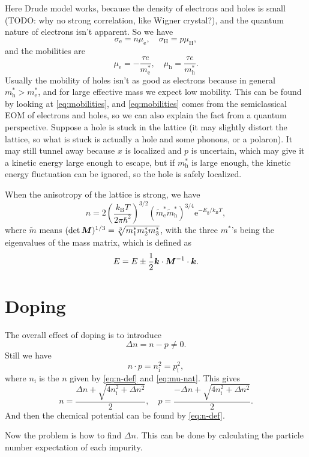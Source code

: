 \documentclass[hyperref, a4paper]{article}
\newcommand*{\ee}{\mathrm{e}}
\begin{document}
Here Drude model works, because the density of electrons and holes is small 
(TODO: why no strong correlation, like Wigner crystal?),
and the quantum nature of electrons isn't apparent.
So we have 
\begin{equation}
    \sigma_\text{e} = n \mu_{\text{e}}, \quad 
    \sigma_{\text{H}} = p \mu_{\text{H}},
\end{equation}
and the mobilities are 
\begin{equation}
    \mu_{\text{e}} = - \frac{\tau e}{m^*_{\text{e}}}, \quad 
    \mu_{\text{h}} =   \frac{\tau e}{m^*_{\text{h}}}.
    \label{eq:mobilities}
\end{equation}
Usually the mobility of holes isn't as good as electrons because in general 
$m_{\text{h}}^* > m_{\text{e}}^*$,
and for large effective mass we expect low mobility.
This can be found by looking at \eqref{eq:mobilities},
and \eqref{eq:mobilities} comes from the semiclassical EOM of electrons and holes,
so we can also explain the fact from a quantum perspective.
Suppose a hole is stuck in the lattice 
(it may slightly distort the lattice,
so what is stuck is actually a hole and some phonons, 
or a polaron).
It may still tunnel away because $x$ is localized 
and $p$ is uncertain, which may give it a kinetic energy large enough to escape,
but if $m^*_{\text{h}}$ is large enough, 
the kinetic energy fluctuation can be ignored,
so the hole is safely localized.

When the anisotropy of the lattice is strong, we have 
\begin{equation}
    n = 2 \left( \frac{k_{\text{B}} T}{2 \pi \hbar^2} \right)^{3/2} (\tilde{m}_{\text{e}}^* \tilde{m}_{\text{h}}^*)^{3/4} \ee^{- E_{\text{g}} / k_{\text{B}} T},
\end{equation}
where $\tilde{m}$ means $(\det \vb*{M})^{1/3} = \sqrt[3]{m_1^* m_2^* m_3^*}$,
with the three $m^*$'s being the eigenvalues of the mass matrix,
which is defined as 
\begin{equation}
    E = E \pm \frac{1}{2} \vb*{k} \cdot \vb*{M}^{-1} \cdot \vb*{k}.
\end{equation}

\section{Doping}

The overall effect of doping is to introduce 
\begin{equation}
    \Delta n = n - p \neq 0.
\end{equation}
Still we have 
\begin{equation}
    n \cdot p = n_{\text{i}}^2 = p_{\text{i}}^2,
\end{equation}
where $n_{\text{i}}$ is the $n$ given by \eqref{eq:n-def} and \eqref{eq:mu-nat}.
This gives 
\begin{equation}
    n = \frac{\Delta n + \sqrt{4 n_{\text{i}}^2 + \Delta n^2}}{2}, \quad 
    p = \frac{-\Delta n + \sqrt{4 n_{\text{i}}^2 + \Delta n^2}}{2}.
\end{equation}
And then the chemical potential can be found by \eqref{eq:n-def}.

Now the problem is how to find $\Delta n$.
This can be done by calculating the particle number expectation of each impurity.
\end{document}
